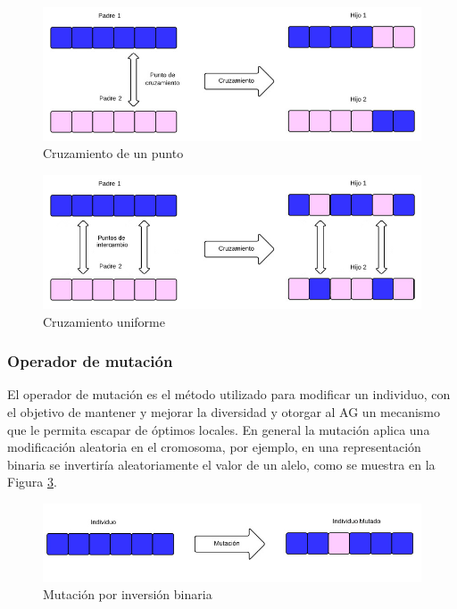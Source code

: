 \begin{figure}[ht]
	\centering
	\includegraphics[width=\textwidth]{Figures/cruzamiento1}
	\caption{Cruzamiento de un punto}
	\label{fig:cruzamiento1}
\end{figure}

\begin{figure}[ht]
	\centering
	\includegraphics[width=\textwidth]{Figures/cruzamiento_uniforme}
	\caption{Cruzamiento uniforme}
	\label{fig:cruzamiento_uniforme}
\end{figure}

\subsubsection{Operador de mutación} 
El operador de mutación es el método utilizado para modificar un individuo, con el objetivo de mantener y mejorar la diversidad y otorgar al AG un mecanismo que le permita escapar de óptimos locales. En general la mutación aplica una modificación aleatoria en el cromosoma, por ejemplo, en una representación binaria se invertiría aleatoriamente el valor de un alelo, como se muestra en la Figura \ref{fig:mutacion1}.
\begin{figure}[ht]
	\centering
	\includegraphics[width=1\linewidth]{Figures/mutacion1}
	\caption{Mutación por inversión binaria}
	\label{fig:mutacion1}
\end{figure}


